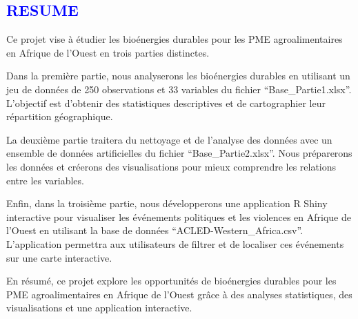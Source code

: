 \documentclass[
]{article}
\author{}
\date{\vspace{-2.5em}}
\begin{document}



\renewcommand{\contentsname}{\textcolor{blue}{Table des matières}}

\textcolor{blue}{\tableofcontents}

\newpage

\textcolor{blue}{\section*{RESUME}}

Ce projet vise à étudier les bioénergies durables pour les PME
agroalimentaires en Afrique de l'Ouest en trois parties distinctes.

Dans la première partie, nous analyserons les bioénergies durables en
utilisant un jeu de données de 250 observations et 33 variables du
fichier ``Base\_Partie1.xlsx''. L'objectif est d'obtenir des
statistiques descriptives et de cartographier leur répartition
géographique.

La deuxième partie traitera du nettoyage et de l'analyse des données
avec un ensemble de données artificielles du fichier
``Base\_Partie2.xlsx''. Nous préparerons les données et créerons des
visualisations pour mieux comprendre les relations entre les variables.

Enfin, dans la troisième partie, nous développerons une application R
Shiny interactive pour visualiser les événements politiques et les
violences en Afrique de l'Ouest en utilisant la base de données
``ACLED-Western\_Africa.csv''. L'application permettra aux utilisateurs
de filtrer et de localiser ces événements sur une carte interactive.

En résumé, ce projet explore les opportunités de bioénergies durables
pour les PME agroalimentaires en Afrique de l'Ouest grâce à des analyses
statistiques, des visualisations et une application interactive.

\newpage
\end{document}
